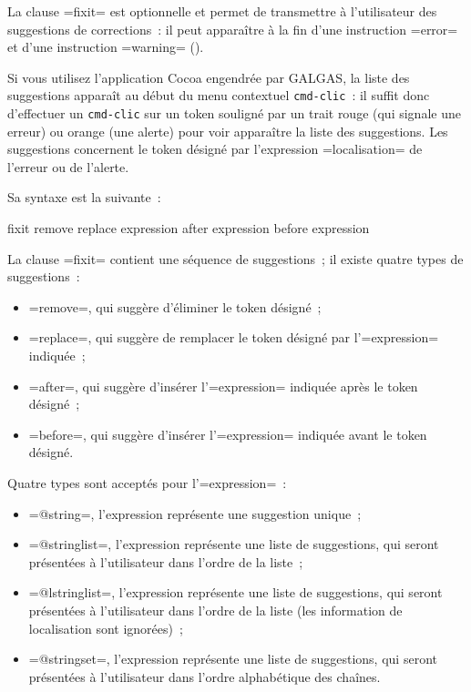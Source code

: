 
La clause \ggs=fixit= est optionnelle et permet de transmettre à l'utilisateur des suggestions de corrections~: il peut apparaître à la fin d'une instruction \ggs=error= et d'une instruction \ggs=warning= ().

Si vous utilisez l'application Cocoa engendrée par GALGAS, la liste des suggestions apparaît au début du menu contextuel \texttt{cmd-clic}~: il suffit donc d'effectuer un \texttt{cmd-clic} sur un token souligné par un trait rouge (qui signale une erreur) ou orange (une alerte) pour voir apparaître la liste des suggestions. Les suggestions concernent le token désigné par l'expression \ggs=localisation= de l'erreur ou de l'alerte.

Sa syntaxe est la suivante~:

\begin{galgas}
fixit {
  remove
  replace expression
  after expression
  before expression
}
\end{galgas}

La clause \ggs=fixit= contient une séquence de suggestions~; il existe quatre types de suggestions~:
\begin{itemize}
\item \ggs=remove=, qui suggère d'éliminer le token désigné~;
\item \ggs=replace=, qui suggère de remplacer le token désigné par l'\ggs=expression= indiquée~;
\item \ggs=after=, qui suggère d'insérer l'\ggs=expression= indiquée après le token désigné~;
\item \ggs=before=, qui suggère d'insérer l'\ggs=expression= indiquée avant le token désigné.
\end{itemize}

Quatre types sont acceptés pour l'\ggs=expression=~:
\begin{itemize}
  \item \ggs=@string=, l'expression représente une suggestion unique~;
  \item \ggs=@stringlist=, l'expression représente une liste de suggestions, qui seront présentées à l'utilisateur dans l'ordre de la liste~;
  \item \ggs=@lstringlist=, l'expression représente une liste de suggestions, qui seront présentées à l'utilisateur dans l'ordre de la liste (les information de localisation sont ignorées)~;
  \item \ggs=@stringset=, l'expression représente une liste de suggestions, qui seront présentées à l'utilisateur dans l'ordre alphabétique des chaînes.
\end{itemize}

